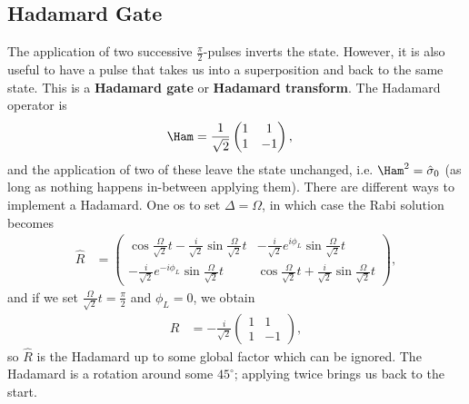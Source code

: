 \documentclass[lasers.tex]{subfiles}
\begin{document}
\section{Hadamard Gate}
The application of two successive $\frac{\pi}{2}$-pulses inverts the state. 
However, it is also useful to have a pulse that takes us into a superposition and back to the same state. 
This is a \textbf{Hadamard gate} or \textbf{Hadamard transform}.
The Hadamard operator is 
\begin{align}
    \Ham &= \frac{1}{\sqrt{2}}\begin{pmatrix}1&1\\1&-1\end{pmatrix},
\end{align}
and the application of two of these leave the state unchanged, i.e. $\Ham^2 = \hat{\sigma}_0$ (as long as nothing happens in-between applying them).
There are different ways to implement a Hadamard. 
One os to set $\Delta=\Omega$, in which case the Rabi solution becomes
\begin{align}
    \hat{R} &= \begin{pmatrix} \cos\frac{\Omega}{\sqrt{2}}t-\frac{i}{\sqrt{2}}\sin\frac{\Omega}{\sqrt{2}}t & -\frac{i}{\sqrt{2}}e^{i\phi_L}\sin\frac{\Omega}{\sqrt{2}}t \\  -\frac{i}{\sqrt{2}}e^{-i\phi_L}\sin\frac{\Omega}{\sqrt{2}}t & \cos\frac{\Omega}{\sqrt{2}}t+\frac{i}{\sqrt{2}}\sin\frac{\Omega}{\sqrt{2}}t \end{pmatrix},
\end{align}
and if we set $\frac{\Omega}{\sqrt{2}}t = \frac{\pi}{2}$ and $\phi_L=0$, we obtain
\begin{align}
    \hat{R} &= -\frac{i}{\sqrt{2}}\begin{pmatrix}1&1\\1&-1\end{pmatrix},
\end{align}
so $\hat{R}$ is the Hadamard up to some global factor which can be ignored. 
The Hadamard is a rotation around some $45^\circ$; applying twice brings us back to the start.

\chapter{}
\end{document}
